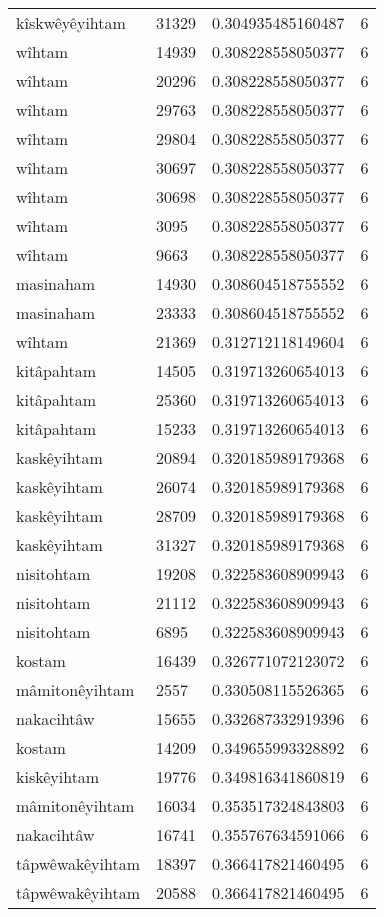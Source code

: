 \begin{longtable}{llll}
kîskwêyêyihtam & 31329 & 0.304935485160487 & 6 \\
wîhtam & 14939 & 0.308228558050377 & 6 \\
wîhtam & 20296 & 0.308228558050377 & 6 \\
wîhtam & 29763 & 0.308228558050377 & 6 \\
wîhtam & 29804 & 0.308228558050377 & 6 \\
wîhtam & 30697 & 0.308228558050377 & 6 \\
wîhtam & 30698 & 0.308228558050377 & 6 \\
wîhtam & 3095 & 0.308228558050377 & 6 \\
wîhtam & 9663 & 0.308228558050377 & 6 \\
masinaham & 14930 & 0.308604518755552 & 6 \\
masinaham & 23333 & 0.308604518755552 & 6 \\
wîhtam & 21369 & 0.312712118149604 & 6 \\
kitâpahtam & 14505 & 0.319713260654013 & 6 \\
kitâpahtam & 25360 & 0.319713260654013 & 6 \\
kitâpahtam & 15233 & 0.319713260654013 & 6 \\
kaskêyihtam & 20894 & 0.320185989179368 & 6 \\
kaskêyihtam & 26074 & 0.320185989179368 & 6 \\
kaskêyihtam & 28709 & 0.320185989179368 & 6 \\
kaskêyihtam & 31327 & 0.320185989179368 & 6 \\
nisitohtam & 19208 & 0.322583608909943 & 6 \\
nisitohtam & 21112 & 0.322583608909943 & 6 \\
nisitohtam & 6895 & 0.322583608909943 & 6 \\
kostam & 16439 & 0.326771072123072 & 6 \\
mâmitonêyihtam & 2557 & 0.330508115526365 & 6 \\
nakacihtâw & 15655 & 0.332687332919396 & 6 \\
kostam & 14209 & 0.349655993328892 & 6 \\
kiskêyihtam & 19776 & 0.349816341860819 & 6 \\
mâmitonêyihtam & 16034 & 0.353517324843803 & 6 \\
nakacihtâw & 16741 & 0.355767634591066 & 6 \\
tâpwêwakêyihtam & 18397 & 0.366417821460495 & 6 \\
tâpwêwakêyihtam & 20588 & 0.366417821460495 & 6 \\

\end{longtable}
